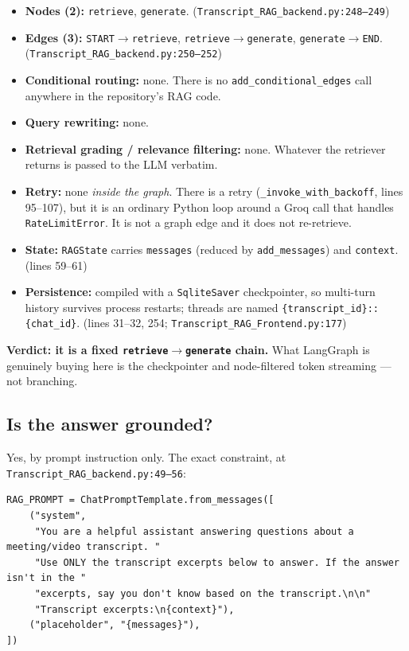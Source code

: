 \documentclass[11pt,a4paper]{article}
\begin{document}
\begin{itemize}
  \item \textbf{Nodes (2):} \texttt{retrieve}, \texttt{generate}.
        (\texttt{Transcript\_RAG\_backend.py:248--249})
  \item \textbf{Edges (3):} \texttt{START}$\to$\texttt{retrieve},
        \texttt{retrieve}$\to$\texttt{generate},
        \texttt{generate}$\to$\texttt{END}.
        (\texttt{Transcript\_RAG\_backend.py:250--252})
  \item \textbf{Conditional routing:} none. There is no
        \texttt{add\_conditional\_edges} call anywhere in the repository's RAG code.
  \item \textbf{Query rewriting:} none.
  \item \textbf{Retrieval grading / relevance filtering:} none. Whatever the
        retriever returns is passed to the LLM verbatim.
  \item \textbf{Retry:} none \emph{inside the graph}. There is a retry
        (\texttt{\_invoke\_with\_backoff}, lines 95--107), but it is an ordinary
        Python loop around a Groq call that handles \texttt{RateLimitError}. It is
        not a graph edge and it does not re-retrieve.
  \item \textbf{State:} \texttt{RAGState} carries \texttt{messages} (reduced by
        \texttt{add\_messages}) and \texttt{context}. (lines 59--61)
  \item \textbf{Persistence:} compiled with a \texttt{SqliteSaver} checkpointer,
        so multi-turn history survives process restarts; threads are named
        \texttt{\{transcript\_id\}::\{chat\_id\}}. (lines 31--32, 254;
        \texttt{Transcript\_RAG\_Frontend.py:177})
\end{itemize}

\noindent
\textbf{Verdict: it is a fixed \texttt{retrieve}$\to$\texttt{generate} chain.}
What LangGraph is genuinely buying here is the checkpointer and
node-filtered token streaming --- not branching.

\subsection{Is the answer grounded?}

Yes, by prompt instruction only. The exact constraint, at
\texttt{Transcript\_RAG\_backend.py:49--56}:

\begin{lstlisting}
RAG_PROMPT = ChatPromptTemplate.from_messages([
    ("system",
     "You are a helpful assistant answering questions about a meeting/video transcript. "
     "Use ONLY the transcript excerpts below to answer. If the answer isn't in the "
     "excerpts, say you don't know based on the transcript.\n\n"
     "Transcript excerpts:\n{context}"),
    ("placeholder", "{messages}"),
])
\end{lstlisting}
\end{document}
